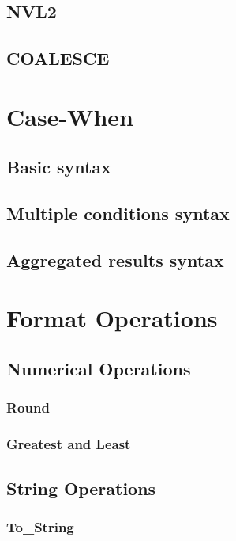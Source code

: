 \documentclass[12pt, letterpaper]{report}
\begin{document}
\section{NVL2}
\blindtext

\section{COALESCE}
\blindtext

\chapter{Case-When}
\blindtext

\section{Basic syntax}
\blindtext

\section{Multiple conditions syntax}
\blindtext

\section{Aggregated results syntax}
\blindtext

\chapter{Format Operations}
\blindtext

\section{Numerical Operations}
\blindtext

\subsection{Round}
\subsection{Greatest and Least}

\section{String Operations}
\blindtext

\subsection{To\_String}
\end{document}
